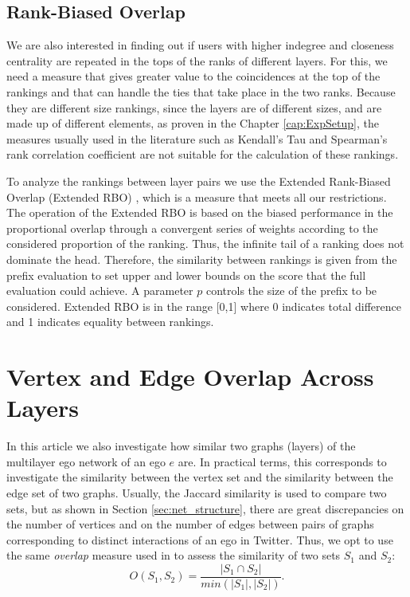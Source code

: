 \subsection*{Rank-Biased Overlap}
\label{subsec:rbo_results}
We are also interested in finding out if users with higher indegree and closeness centrality are repeated in the tops of the ranks of different layers. For this, we need a measure that gives greater value to the coincidences at the top of the rankings and that can handle the ties that take place in the two ranks. Because they are different size rankings, since the layers are of different sizes, and are made up of different elements, as proven in the Chapter \ref{cap:ExpSetup}, the measures usually used in the literature such as Kendall's Tau and Spearman's rank correlation coefficient are not suitable for the calculation of these rankings.

To analyze the rankings between layer pairs we use the Extended Rank-Biased Overlap (Extended RBO) \cite{Webber2010}, which is a measure that meets all our restrictions. The operation of the Extended RBO is based on the biased performance in the proportional overlap through a convergent series of weights according to the considered proportion of the ranking. Thus, the infinite tail of a ranking does not dominate the head. Therefore, the similarity between rankings is given from the prefix evaluation to set upper and lower bounds on the score that the full evaluation could achieve. A parameter $p$ controls the size of the prefix to be considered. Extended RBO is in the range [0,1] where 0 indicates total difference and 1 indicates equality between rankings.




\section{Vertex and Edge Overlap Across Layers}
\label{sec:vertex_edges_overlap}

In this article we also investigate how similar two graphs (layers) of the multilayer ego network of an ego $e$ are. In practical terms, this corresponds to investigate  the similarity between the vertex set and the similarity between the edge set of two graphs. Usually, the Jaccard similarity is used to compare two sets, but as shown in Section \ref{sec:net_structure}, there are great discrepancies on the number of vertices and on the number of edges between  pairs of graphs corresponding to distinct interactions of an ego in Twitter. Thus, we opt to use the same {\em overlap} measure used in \cite{Omodei2015} to assess  the similarity of two sets $S_1$ and $S_2$:
\begin{equation}\label{eq:overlap}
O(S_1, S_2)= \frac{|S_1\cap S_2|}{min(|S_1|, |S_2|)}.
\end{equation}


